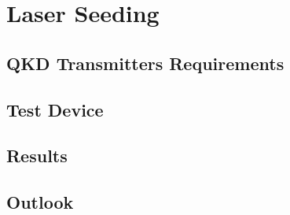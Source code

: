 %
%
\let\textcircled=\pgftextcircled
\chapter{Laser Seeding}
\label{chap:laser-seeding}

\section{QKD Transmitters Requirements}
\label{sec:sec06}

\section{Test Device}

\section{Results}

\section{Outlook}


